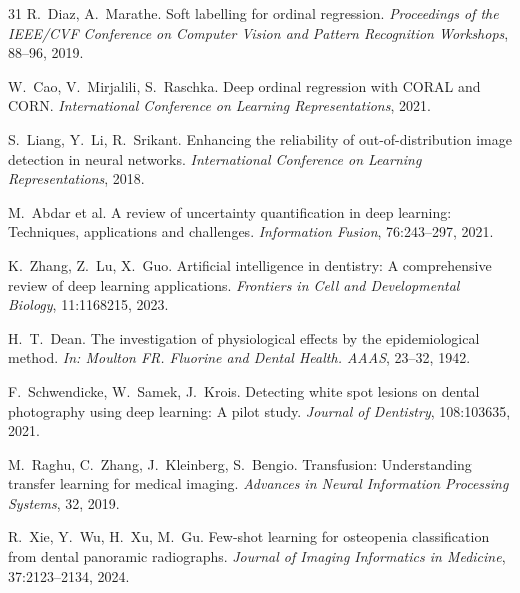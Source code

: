 \documentclass[12pt,a4paper]{ctexart}
\begin{document}
\begin{thebibliography}{31}
R.\ Diaz, A.\ Marathe.
Soft labelling for ordinal regression.
\textit{Proceedings of the IEEE/CVF Conference on Computer Vision and Pattern Recognition Workshops}, 88--96, 2019.

W.\ Cao, V.\ Mirjalili, S.\ Raschka.
Deep ordinal regression with CORAL and CORN.
\textit{International Conference on Learning Representations}, 2021.

S.\ Liang, Y.\ Li, R.\ Srikant.
Enhancing the reliability of out-of-distribution image detection in neural networks.
\textit{International Conference on Learning Representations}, 2018.

M.\ Abdar et al.
A review of uncertainty quantification in deep learning: Techniques, applications and challenges.
\textit{Information Fusion}, 76:243--297, 2021.

K.\ Zhang, Z.\ Lu, X.\ Guo.
Artificial intelligence in dentistry: A comprehensive review of deep learning applications.
\textit{Frontiers in Cell and Developmental Biology}, 11:1168215, 2023.

H.\ T.\ Dean.
The investigation of physiological effects by the epidemiological method.
\textit{In: Moulton FR. Fluorine and Dental Health. AAAS}, 23--32, 1942.

F.\ Schwendicke, W.\ Samek, J.\ Krois.
Detecting white spot lesions on dental photography using deep learning: A pilot study.
\textit{Journal of Dentistry}, 108:103635, 2021.

M.\ Raghu, C.\ Zhang, J.\ Kleinberg, S.\ Bengio.
Transfusion: Understanding transfer learning for medical imaging.
\textit{Advances in Neural Information Processing Systems}, 32, 2019.

R.\ Xie, Y.\ Wu, H.\ Xu, M.\ Gu.
Few-shot learning for osteopenia classification from dental panoramic radiographs.
\textit{Journal of Imaging Informatics in Medicine}, 37:2123--2134, 2024.

\end{thebibliography}
\end{document}
